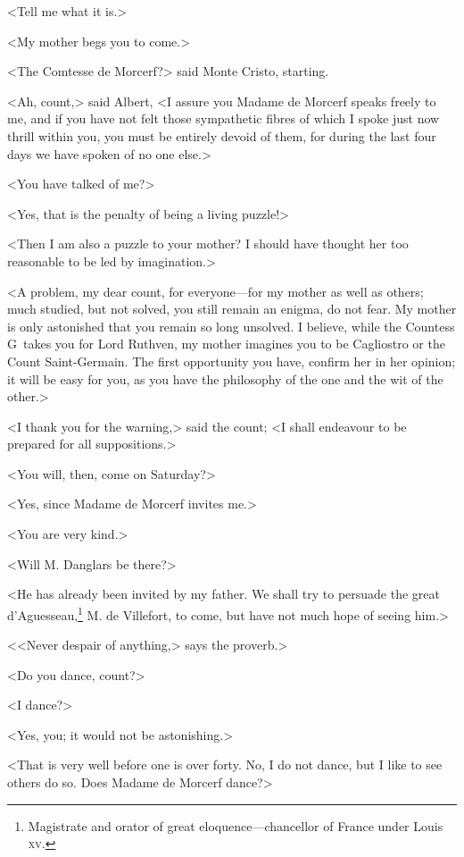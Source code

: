 <Tell me what it is.> 

 <My mother begs you to come.> 

 <The Comtesse de Morcerf?> said Monte Cristo, starting. 

 <Ah, count,> said Albert, <I assure you Madame de Morcerf speaks freely to me, and if you have not felt those sympathetic fibres of which I spoke just now thrill within you, you must be entirely devoid of them, for during the last four days we have spoken of no one else.> 

 <You have talked of me?> 

 <Yes, that is the penalty of being a living puzzle!> 

 <Then I am also a puzzle to your mother? I should have thought her too reasonable to be led by imagination.> 

 <A problem, my dear count, for everyone—for my mother as well as others; much studied, but not solved, you still remain an enigma, do not fear. My mother is only astonished that you remain so long unsolved. I believe, while the Countess G\doubleemdash~takes you for Lord Ruthven, my mother imagines you to be Cagliostro or the Count Saint-Germain. The first opportunity you have, confirm her in her opinion; it will be easy for you, as you have the philosophy of the one and the wit of the other.> 

 <I thank you for the warning,> said the count; <I shall endeavour to be prepared for all suppositions.> 

 <You will, then, come on Saturday?> 

 <Yes, since Madame de Morcerf invites me.> 

 <You are very kind.> 

 <Will M. Danglars be there?> 

 <He has already been invited by my father. We shall try to persuade the great d'Aguesseau,\footnote{Magistrate and orator of great eloquence—chancellor of France under Louis \textsc{xv.} } M. de Villefort, to come, but have not much hope of seeing him.> 

 <<Never despair of anything,> says the proverb.> 

 <Do you dance, count?> 

 <I dance?> 

 <Yes, you; it would not be astonishing.> 

 <That is very well before one is over forty. No, I do not dance, but I like to see others do so. Does Madame de Morcerf dance?> 

